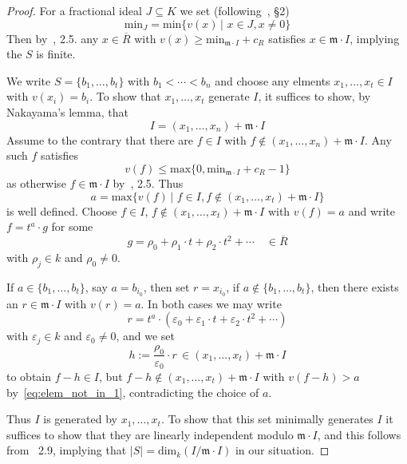 \documentclass[12pt]{amsart}
\theoremstyle{plain}%
\theoremstyle{definition}
\renewcommand{\(}{\left(}
\renewcommand{\)}{\right)}
\renewcommand{\leq}{\leqslant}
\renewcommand{\geq}{\geqslant}
\begin{document}
\begin{proof}
For a fractional ideal $J \subseteq K$ we set 
(following~\cite{HK}, \S 2)
	$$ \mathrm{min}_J = \mathrm{min}\{ v(x) \, \vert \,\, x 
    \in J, x \neq 0 \} $$
Then by~\cite{HK}, 2.5. any $x \in \overline{R}$ with 
$v(x) \geq \mathrm{min}_{\mathfrak m \cdot I} + c_R$ 
satisfies $x \in \mathfrak m \cdot I$, implying the $S$ 
is finite. 

We write $S = \{b_1, \ldots, b_t\}$ with $b_1 < \cdots < b_n$ and choose any elments 
$x_1, \ldots , x_t \in I$ with $v(x_i) = b_i$. To show that 
$x_1, \ldots, x_t$ generate $I$,  it suffices to show, by 
Nakayama's lemma, that 
	$$ I = (x_1, \ldots, x_n) + \mathfrak m \cdot I $$
Assume to the contrary that there are $f \in I$ with $f 
\notin (x_1, \ldots, x_n) + \mathfrak m \cdot I $. Any such 
$f$ satisfies 
	$$ v(f) \leq \mathrm{max} \{0, \mathrm{min}_{\mathfrak m 
    \cdot I} + c_R - 1 \} $$ 
as otherwise $f \in \mathfrak m \cdot I$ by~\cite{HK}, 2.5. 
Thus 
	$$ a = \mathrm{max} \{ v(f) \, \vert \,\,  f \in I, f 
    \notin (x_1, \ldots, x_t) + \mathfrak m \cdot I  \} $$
is well defined. Choose $f \in I$, $f \notin  (x_1, \ldots, 
x_t) + \mathfrak m \cdot I$ with $v(f) = a$ and write 
$f = t^a \cdot g$ for some 
	\begin{equation}\label{eq:elem_not_in_1} 
	g = \rho_0 + \rho_1 \cdot t + \rho_2 \cdot t^2 + \cdots 
    \quad \in \overline{R} 
	\end{equation} 
with $\rho_j \in k$ and  $\rho_0 \neq 0$. 

If $a \in \{b_1, \ldots, b_t\}$, say $a = b_{i_0}$, then set 
$r = x_{i_0}$, if $a \notin \{b_1, \ldots, b_t\}$, then there 
exists an $r \in \mathfrak m \cdot I$ with 
$v(r) = a$. In both cases we may write 
	$$ r = t^a \cdot \left(\varepsilon_0 + \varepsilon_1 
    \cdot t + \varepsilon_2 \cdot t^2 + \cdots \right)  $$
with $\varepsilon_j \in k$ and  $\varepsilon_0 \neq 0$, and 
we set
	$$ h := \frac {\rho_0}{\varepsilon_0} \cdot r \, \in 
	(x_1, \ldots, x_t) + \mathfrak m \cdot I $$ 
to obtain $f-h \in I$, but $f -h \notin (x_1, \ldots, x_t) 
+ \mathfrak m \cdot I$ with $ v(f-h) > a$ 
by~\eqref{eq:elem_not_in_1}, contradicting the choice of $a$. 

Thus $I$ is generated by $x_1, \ldots, x_t$. To show that 
this set minimally generates $I$ it suffices to show that 
they are linearly independent modulo $\mathfrak m \cdot I$, 
and this follows from~\cite{HK} 2.9, implying that 
$\vert S \vert = \mathrm{dim}_k(I/\mathfrak m \cdot I)$ in 
our situation. 


\end{proof}
\end{document}
